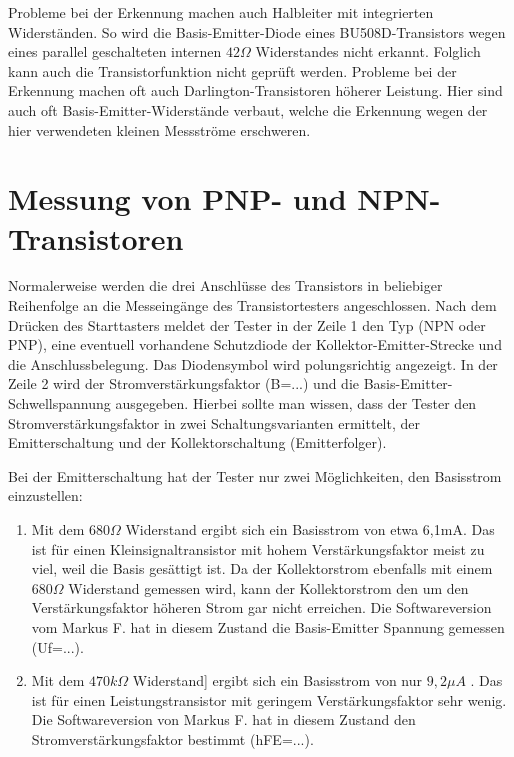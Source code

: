 Probleme bei der Erkennung machen auch Halbleiter mit integrierten Widerständen.
So wird die Basis-Emitter-Diode eines BU508D-Transistors wegen eines parallel geschalteten internen
\(42 \Omega\) Widerstandes nicht erkannt.
Folglich kann auch die Transistorfunktion nicht geprüft werden.
Probleme bei der Erkennung machen oft auch Darlington-Transistoren höherer Leistung. Hier sind auch
oft Basis-Emitter-Widerstände verbaut, welche die Erkennung wegen der hier verwendeten kleinen Messströme erschweren.

\section{Messung von PNP- und NPN-Transistoren}
Normalerweise werden die drei Anschlüsse des Transistors in beliebiger Reihenfolge an die Messeingänge des
Transistortesters angeschlossen.
Nach dem Drücken des Starttasters meldet der Tester in der Zeile 1 den Typ (NPN oder PNP), 
eine eventuell vorhandene Schutzdiode der Kollektor-Emitter-Strecke und
die Anschlussbelegung. Das Diodensymbol wird  polungsrichtig angezeigt.
In der Zeile 2 wird der Stromverstärkungsfaktor (B=...) und die Basis-Emitter-Schwellspannung ausgegeben.
Hierbei sollte man wissen, dass der Tester den Stromverstärkungsfaktor in zwei Schaltungsvarianten 
ermittelt, der Emitterschaltung und der Kollektorschaltung (Emitterfolger).

Bei der Emitterschaltung hat der Tester nur zwei Möglichkeiten, den Basisstrom einzustellen:
\begin{enumerate}
\item Mit dem \(680 \Omega\) Widerstand ergibt sich ein Basisstrom von etwa 6,1mA. Das ist für einen
Kleinsignaltransistor mit hohem Verstärkungsfaktor meist zu viel, weil die Basis gesättigt ist.
Da der Kollektorstrom ebenfalls mit einem \(680 \Omega\) Widerstand gemessen wird, kann der Kollektorstrom
den um den Verstärkungsfaktor höheren Strom gar nicht erreichen. Die Softwareversion vom Markus F. hat
in diesem Zustand die Basis-Emitter Spannung gemessen (Uf=...).\\
\item Mit dem \(470 k\Omega\) Widerstand] ergibt sich ein Basisstrom von nur \(9,2 \mu A\) .
Das ist für einen Leistungstransistor mit geringem Verstärkungsfaktor sehr wenig.
Die Softwareversion von Markus F. hat in diesem Zustand den Stromverstärkungsfaktor bestimmt (hFE=...).\\
\end{enumerate}

